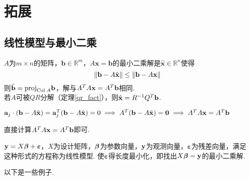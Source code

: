 
\section{拓展}
\subsection{线性模型与最小二乘}%
\begin{theorem}[最小二乘]
$A$为$m\times n$的矩阵，$\mathbf{b}\in\mathbb{R}^m$，$A\mathbf{x}=\mathbf{b}$的最小二乘解是$\hat{\mathbf{x}}\in\mathbb{R}^n$使得
\[\|\mathbf{b}-A\hat{\mathbf{x}}\|\leq\|\mathbf{b}-A\mathbf{x}\|\]
则$\displaystyle\hat{\mathbf{b}}=\mathrm{proj}_{\mathrm{Col}\;A}\mathbf{b}$，解与$A^TA\mathbf{x}=A^T\mathbf{b}$相同.\\
若$A$可被$QR$分解（定理\ref{qr_fact}），则$\hat{\mathbf{x}}=R^{-1}Q^T\mathbf{b}$.
\end{theorem}
\begin{analysis}
$\mathbf{a}_j\cdot(\mathbf{b}-A\hat{\mathbf{x}})=\mathbf{a}_j^T(\mathbf{b}-A\hat{\mathbf{x}})=0\implies A^T(\mathbf{b}-A\hat{\mathbf{x}})=\mathbf{0}\implies A^TA\mathbf{x}=A^T\mathbf{b}$
\end{analysis}
\begin{myalgorithm}[最小二乘估计]
直接计算$A^TA\mathbf{x}=A^T\mathbf{b}$即可.
\end{myalgorithm}
\begin{definition}[一般线性模型]
$\mathbf{y}=X\bm{\beta}+\bm{\varepsilon}$，$X$为设计矩阵，$\bm{\beta}$为参数向量，$\mathbf{y}$为观测向量，$\bm{\varepsilon}$为残差向量，满足这种形式的方程称为线性模型. 使$\bm{\varepsilon}$得长度最小化，即找出$X\bm{\beta}=\mathbf{y}$的最小二乘解.
\end{definition}
以下是一些例子.
